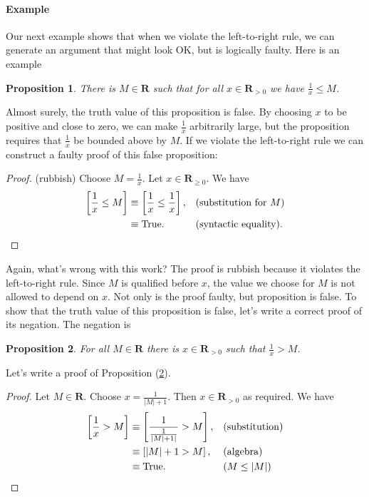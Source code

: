 \documentclass[12pt,fleqn]{article}
\newcommand{\reals}{\mathbf{R}}
\newcommand{\true}{\mathrm{True}}
\newenvironment{myproof}
  {\begin{shaded}\begin{proof}}
  {\end{proof}\end{shaded}}
\newtheorem{prop}{Proposition}
\newcounter{ex}\setcounter{ex}{0}
\newcommand{\ex}{%
\setcounter{ex}{\value{ex}+1}
\paragraph{Example \theex}}
\begin{document}
\ex Our next example  shows that when we violate the left-to-right rule, we can generate an  argument that might look OK, but 
is logically faulty.  Here is an example

\begin{prop} There is $M \in \reals$ such that for all $x \in \reals_{>0}$ we have  $\frac{1}{x} \leq M$.  
\end{prop}

Almost surely, the truth value of this proposition is false. By choosing $x$ to be positive and close to zero,  we can make $\frac{1}{x}$ 
arbitrarily large, but the proposition requires that  $\frac{1}{x}$   be bounded above by $M$. If we violate the left-to-right rule
we can construct a faulty proof of this false proposition:

\begin{myproof} (rubbish) Choose $M = \frac{1}{x}$. Let  $x \in \reals_{\geq 0}$. We have
\begin{align*}
 \left[\frac{1}{x}  \leq M  \right] &\equiv
 \left[\frac{1}{x}  \leq  \frac{1}{x}  \right],  &&\mbox{(substitution for $M$)} \\
 &\equiv \mbox{True}. &&\mbox{(syntactic equality)}.   \qedhere
\end{align*}
\end{myproof}
\noindent Again, what's wrong with this work?   The proof is rubbish because it violates  the left-to-right rule.  Since $M$ is qualified before $x$,
  the value we choose for $M$ is not allowed to depend on $x$. Not only is the proof faulty, but proposition is false.  To show that the 
  truth value of this proposition is false, let's write a correct proof of its negation.  The negation  is 

\begin{prop} For all $M \in \reals$  there is $x \in \reals_{>0}$ such that $\frac{1}{x} >  M$.  \label{px14} \end{prop}

Let's write a proof of  Proposition (\ref{px14}).

\begin{myproof} Let $M \in \reals$.  Choose $x  = \frac{1}{|M| + 1 }$. Then  $x \in \reals_{>0}$ as required.  We have
\begin{align*}
  \left [ \frac{1}{x} > M \right] &\equiv \left[  \frac{1}{\frac{1}{|M| + 1|} } > M   \right], &&\text{(substitution)} \\
                                                      &\equiv \left[|M| + 1 > M \right], &&\text{(algebra)} \\
                                                      &\equiv \true.  &&( M \leq |M|) \qedhere
\end{align*}
\end{myproof} 
\end{document}
